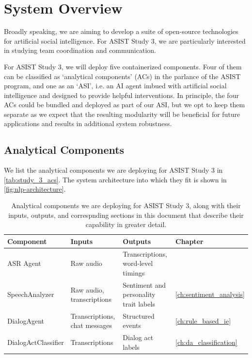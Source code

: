 \chapter{System Overview}
\label{ch:system}

Broadly speaking, we are aiming to develop a suite of open-source technologies
for artificial social intelligence. For ASIST Study 3, we are particularly
interested in studying team coordination and communication.

For ASIST Study 3, we will deploy five containerized components. Four of them
can be classified as `analytical components' (ACs) in the parlance of the ASIST
program, and one as an `ASI', i.e. an AI agent imbued with artificial social
intelligence and designed to provide helpful interventions. In principle, the
four ACs could be bundled and deployed as part of our ASI, but we opt to keep
them separate as we expect that the resulting modularity will be beneficial for
future applications and results in additional system robustness.


\section{Analytical Components}

We list the analytical components we are deploying for ASIST Study 3 in
\autoref{tab:study_3_acs}. The system architecture into which they fit is shown
in \autoref{fig:nlp-architecture}.

\begin{table}
    \small
    \begin{tabularx}{5.5in}{llXl}
        \toprule
        Component           & Inputs                        & Outputs               & Chapter\\\midrule
        ASR Agent           & Raw audio                     & Transcriptions, word-level timings     & \\
        SpeechAnalyzer      & Raw audio, transcriptions     & Sentiment and personality trait labels & \autoref{ch:sentiment_analysis}\\
        DialogAgent         & Transcriptions, chat messages & Structured events                      & \autoref{ch:rule_based_ie}\\
        DialogActClassifier & Transcriptions                & Dialog act labels                      & \autoref{ch:da_classification}\\
        \bottomrule
    \end{tabularx}
    \caption{%
        Analytical components we are deploying for ASIST Study 3, along with
        their inputs, outputs, and correspnding sections in this document that
        describe their capability in greater detail.
    }
    \label{tab:study_3_acs}
\end{table}



